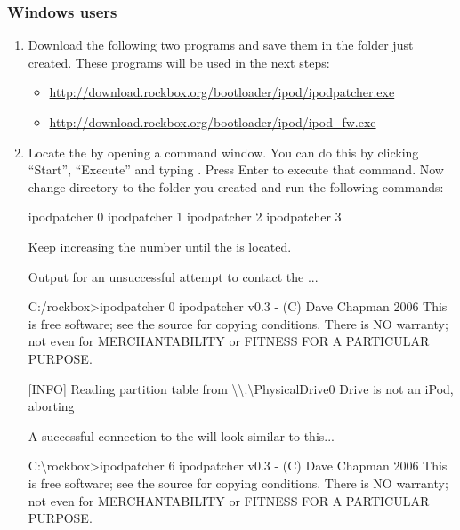 \subsubsection{Windows users}
\begin{enumerate}
  \item Download the following two programs and save them in the folder just
    created. These programs will be used in the next steps:
    \begin{itemize}
      \item \url{http://download.rockbox.org/bootloader/ipod/ipodpatcher.exe}
      \item \url{http://download.rockbox.org/bootloader/ipod/ipod_fw.exe}
    \end{itemize}
  \item Locate the \dap{} by opening a command window. You can do this by
    clicking ``Start'', ``Execute'' and typing . Press Enter to
    execute that command. Now change directory to the
    folder you created and run the following commands:
    \begin{code}
    ipodpatcher 0
    ipodpatcher 1
    ipodpatcher 2
    ipodpatcher 3
    \end{code}
    Keep increasing the number until the \dap{} is located. 

    Output for an unsuccessful attempt to contact the \dap{}...
    \begin{code}
    C:/rockbox>ipodpatcher 0
    ipodpatcher v0.3 - (C) Dave Chapman 2006
    This is free software; see the source for copying conditions.  There is NO
    warranty; not even for MERCHANTABILITY or FITNESS FOR A PARTICULAR PURPOSE.

    [INFO] Reading partition table from \textbackslash\textbackslash{}.\textbackslash{}PhysicalDrive0
    Drive is not an iPod, aborting
    \end{code}
    
    A successful connection to the \dap{} will look similar to this...
    \begin{code}
    C:\textbackslash{}rockbox>ipodpatcher 6
    ipodpatcher v0.3 - (C) Dave Chapman 2006
    This is free software; see the source for copying conditions.  There is NO
    warranty; not even for MERCHANTABILITY or FITNESS FOR A PARTICULAR PURPOSE.


\end{code}
\end{enumerate}
